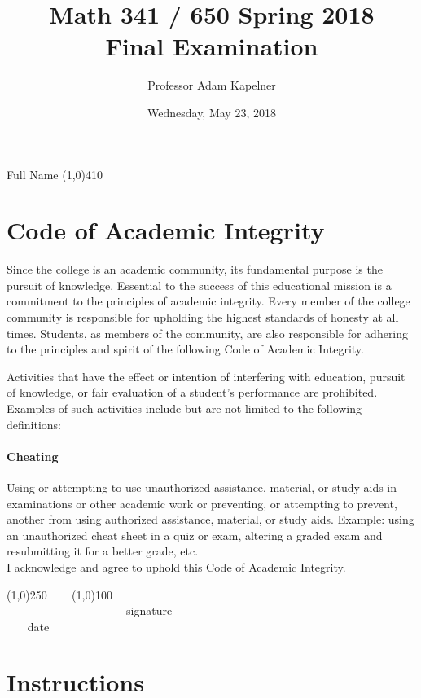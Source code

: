 \documentclass[12pt]{article}
\title{Math 341 / 650 Spring 2018 \\ Final Examination}
\author{Professor Adam Kapelner}
\date{Wednesday, May 23, 2018}
\begin{document}
\maketitle

\noindent Full Name \line(1,0){410}

\thispagestyle{empty}

\section*{Code of Academic Integrity}

\footnotesize
Since the college is an academic community, its fundamental purpose is the pursuit of knowledge. Essential to the success of this educational mission is a commitment to the principles of academic integrity. Every member of the college community is responsible for upholding the highest standards of honesty at all times. Students, as members of the community, are also responsible for adhering to the principles and spirit of the following Code of Academic Integrity.

Activities that have the effect or intention of interfering with education, pursuit of knowledge, or fair evaluation of a student's performance are prohibited. Examples of such activities include but are not limited to the following definitions:

\paragraph{Cheating} Using or attempting to use unauthorized assistance, material, or study aids in examinations or other academic work or preventing, or attempting to prevent, another from using authorized assistance, material, or study aids. Example: using an unauthorized cheat sheet in a quiz or exam, altering a graded exam and resubmitting it for a better grade, etc.
\\

\noindent I acknowledge and agree to uphold this Code of Academic Integrity. \\

\begin{center}
\line(1,0){250} ~~~ \line(1,0){100}\\
~~~~~~~~~~~~~~~~~~~~~signature~~~~~~~~~~~~~~~~~~~~~~~~~~~~~~~~~~~~~~~~~~~~~ date
\end{center}

\normalsize

\section*{Instructions}
\end{document}
